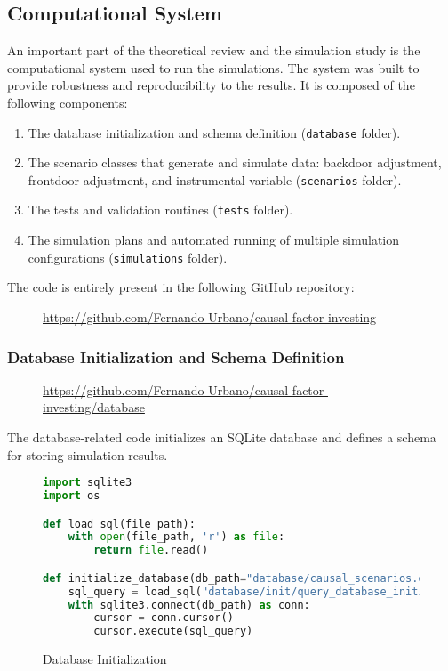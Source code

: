 \documentclass{article}
\numberwithin{equation}{section}
\begin{document}
\newpage

\subsection{Computational System}
\label{subsec:appendix_computational_system}

An important part of the theoretical review and the simulation study is the computational system used to run the simulations. The system was built to provide robustness and reproducibility to the results. It is composed of the following components:

\begin{enumerate}[label=\roman*.]
    \item The database initialization and schema definition (\texttt{database} folder).
    \item The scenario classes that generate and simulate data: backdoor adjustment, frontdoor adjustment, and instrumental variable (\texttt{scenarios} folder).
    \item The tests and validation routines (\texttt{tests} folder).
    \item The simulation plans and automated running of multiple simulation configurations (\texttt{simulations} folder).
\end{enumerate}

The code is entirely present in the following GitHub repository:

\begin{figure}[H]
    \centering
    \url{https://github.com/Fernando-Urbano/causal-factor-investing}
\end{figure}

\subsubsection{Database Initialization and Schema Definition}

\begin{figure}[H]
    \centering
    \url{https://github.com/Fernando-Urbano/causal-factor-investing/database}
\end{figure}


The database-related code initializes an SQLite database and defines a schema for storing simulation results.

\begin{figure}[H]
\begin{lstlisting}[language=python]
import sqlite3
import os

def load_sql(file_path):
    with open(file_path, 'r') as file:
        return file.read()

def initialize_database(db_path="database/causal_scenarios.db"):
    sql_query = load_sql("database/init/query_database_initialization.sql")
    with sqlite3.connect(db_path) as conn:
        cursor = conn.cursor()
        cursor.execute(sql_query)
\end{lstlisting}
\caption{Database Initialization}
\end{figure}
\end{document}
